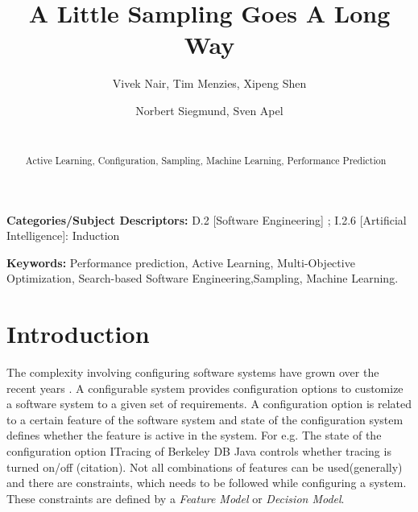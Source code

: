 \documentclass{sig-alternative}
\begin{document}
\title{ A Little Sampling Goes A Long Way}
\author{
        \alignauthor Vivek Nair, Tim Menzies, Xipeng Shen 
    \and  
        \alignauthor Norbert Siegmund, Sven Apel \\
        \\
       }

\maketitle 
\thispagestyle{plain}
\pagestyle{plain}
\begin{abstract}
Active Learning, Configuration, Sampling, Machine Learning, Performance Prediction


\end{abstract}

\vspace{1mm}
\noindent
{\bf Categories/Subject Descriptors:} 
D.2 [Software Engineering] ;
I.2.6 [Artificial Intelligence]: Induction

 
\vspace{1mm}
\noindent

{\bf Keywords:} Performance prediction, Active Learning, 
Multi-Objective Optimization,
Search-based Software Engineering,Sampling, Machine Learning.

 
 
\section{Introduction}
 The complexity involving configuring software systems have grown over the recent years \cite{berger2013study}. A configurable system provides configuration options to customize a software system to a given set of requirements. 
 A configuration option is related to a certain feature of the software system and state of the configuration system defines whether the feature is  active in the system.
 For e.g. The state of the configuration option ITracing of  Berkeley DB Java controls whether tracing is turned on/off (citation). Not all combinations of features can be used(generally) and there are constraints, which needs to be followed while configuring a system. These constraints are defined by a \textit{Feature Model}\cite{kang1990feature} or \textit{Decision Model}\cite{schmid2011comparison}. 
 
\end{document}

